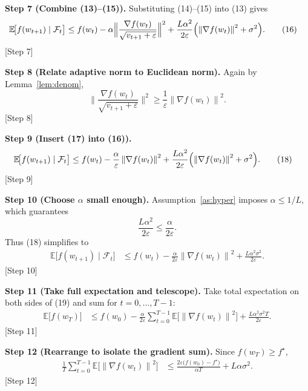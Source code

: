 \documentclass{article}
\newcommand{\EE}{\mathbb{E}}
\newcommand{\norm}[1]{\left\lVert#1\right\rVert}
\begin{document}
\noindent\textbf{Step 7 (Combine (13)–(15)).}  
Substituting (14)–(15) into (13) gives
\begin{align}
\EE\!\bigl[f(w_{t+1})\mid\mathcal{F}_{t}\bigr]
&\le f(w_{t})
   -\alpha\Big\|\frac{\nabla f(w_{t})}{\sqrt{v_{t+1}+\varepsilon}}\Big\|^{2}
   +\frac{L\alpha^{2}}{2\varepsilon}
     \Bigl(\norm{\nabla f(w_{t})}^{2}+\sigma^{2}\Bigr). \tag{16}
\end{align}
[Step 7]

\noindent\textbf{Step 8 (Relate adaptive norm to Euclidean norm).}  
Again by Lemma~\ref{lem:denom},
\[
\Big\|\frac{\nabla f(w_{t})}{\sqrt{v_{t+1}+\varepsilon}}\Big\|^{2}
\ge \frac{1}{\varepsilon}\norm{\nabla f(w_{t})}^{2}. \tag{17}
\]
[Step 8]

\noindent\textbf{Step 9 (Insert (17) into (16)).}
\begin{align}
\EE\!\bigl[f(w_{t+1})\mid\mathcal{F}_{t}\bigr]
&\le f(w_{t})
   -\frac{\alpha}{\varepsilon}\norm{\nabla f(w_{t})}^{2}
   +\frac{L\alpha^{2}}{2\varepsilon}
     \Bigl(\norm{\nabla f(w_{t})}^{2}+\sigma^{2}\Bigr). \tag{18}
\end{align}
[Step 9]

\noindent\textbf{Step 10 (Choose $\alpha$ small enough).}  
Assumption~\ref{as:hyper} imposes $\alpha\le 1/L$, which guarantees
\[
\frac{L\alpha^{2}}{2\varepsilon}\le\frac{\alpha}{2\varepsilon}.
\]
Thus (18) simplifies to
\begin{align}
\EE\!\bigl[f(w_{t+1})\mid\mathcal{F}_{t}\bigr]
&\le f(w_{t})
   -\frac{\alpha}{2\varepsilon}\norm{\nabla f(w_{t})}^{2}
   +\frac{L\alpha^{2}\sigma^{2}}{2\varepsilon}. \tag{19}
\end{align}
[Step 10]

\noindent\textbf{Step 11 (Take full expectation and telescope).}  
Take total expectation on both sides of (19) and sum for $t=0,\dots,T-1$:
\begin{align}
\EE\!\bigl[f(w_{T})\bigr]
&\le f(w_{0})
   -\frac{\alpha}{2\varepsilon}\sum_{t=0}^{T-1}\EE\!\bigl[\norm{\nabla f(w_{t})}^{2}\bigr]
   +\frac{L\alpha^{2}\sigma^{2}T}{2\varepsilon}. \tag{20}
\end{align}
[Step 11]

\noindent\textbf{Step 12 (Rearrange to isolate the gradient sum).}
Since $f(w_{T})\ge f^{\star}$,
\begin{align}
\frac{1}{T}\sum_{t=0}^{T-1}\EE\!\bigl[\norm{\nabla f(w_{t})}^{2}\bigr]
&\le \frac{2\varepsilon\bigl(f(w_{0})-f^{\star}\bigr)}{\alpha T}
   +L\alpha\sigma^{2}. \tag{21}
\end{align}
[Step 12]
\end{document}

